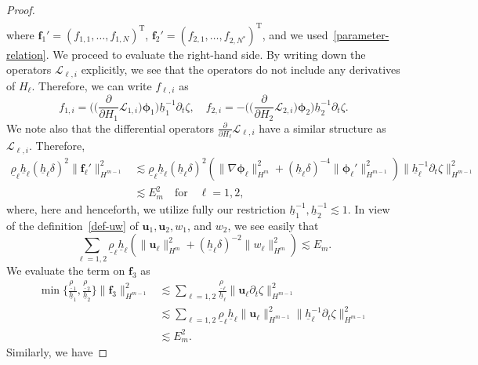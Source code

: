 \documentclass[11pt,leqno]{article}
\numberwithin{equation}{section}
\numberwithin{figure}{section}
\begin{document}
\begin{proof}
\begin{align}
\end{align}
%
where $\bm{f}_1'=(f_{1,1},\ldots,f_{1,N})^\mathrm{T}$, $\bm{f}_2'=(f_{2,1},\ldots,f_{2,N^*})^\mathrm{T}$, 
and we used~\eqref{parameter-relation}. 
We proceed to evaluate the right-hand side. 
By writing down the operators $\mathcal{L}_{\ell,i}$ explicitly, we see that the operators do not include 
any derivatives of $H_{\ell}$. 
Therefore, we can write $f_{\ell,i}$ as 
%
\[
f_{1,i} = \biggl(\biggl(\frac{\partial}{\partial H_1}\mathcal{L}_{1,i}\biggr)\bm{\phi}_1\biggr)
  \underline{h}_1^{-1}\partial_t\zeta, \quad
f_{2,i} = -\biggl(\biggl(\frac{\partial}{\partial H_2}\mathcal{L}_{2,i}\biggr)\bm{\phi}_2\biggr)
  \underline{h}_2^{-1}\partial_t\zeta.
\]
%
We note also that the differential operators $\frac{\partial}{\partial H_\ell}\mathcal{L}_{\ell,i}$ have a 
similar structure as $\mathcal{L}_{\ell,i}$. 
Therefore, 
%
\begin{align*}
\underline{\rho}_\ell\underline{h}_\ell
  (\underline{h}_\ell\delta)^2\|\bm{f}_\ell'\|_{H^{m-1}}^2
&\lesssim \underline{\rho}_\ell\underline{h}_\ell
  (\underline{h}_\ell\delta)^2 ( \|\nabla\bm{\phi}_\ell\|_{H^m}^2
   + (\underline{h}_\ell\delta)^{-4}\|\bm{\phi}_\ell'\|_{H^{m-1}}^2 ) \|\underline{h}_\ell^{-1}\partial_t\zeta\|_{H^{m-1}}^2 \\
&\lesssim E_m^2 \quad\mbox{for}\quad \ell=1,2,
\end{align*}
%
where, here and henceforth, we utilize fully our restriction $\underline{h}_1^{-1},\underline{h}_2^{-1} \lesssim 1$. 
In view of the definition~\eqref{def-uw} of $\bm{u}_1, \bm{u}_2,w_1$, and $w_2$, we see easily that 
%
\begin{equation}\label{estimates-uw}
\sum_{\ell=1,2}\underline{\rho}_\ell\underline{h}_\ell(\|\bm{u}_\ell\|_{H^m}^2
 + (\underline{h}_\ell\delta)^{-2}\|w_\ell\|_{H^m}^2 ) \lesssim E_m.
\end{equation}
%
We evaluate the term on $\bm{f}_3$ as 
%
\begin{align*}
\min\biggl\{\frac{\underline{\rho}_1}{\underline{h}_1},\frac{\underline{\rho}_2}{\underline{h}_2} \biggr\}
  \|\bm{f}_3\|_{H^{m-1}}^2
&\lesssim \sum_{\ell=1,2} \frac{\underline{\rho}_\ell}{\underline{h}_\ell}\|\bm{u}_\ell\partial_t\zeta\|_{H^{m-1}}^2 \\
&\lesssim \sum_{\ell=1,2} \underline{\rho}_\ell\underline{h}_\ell
  \|\bm{u}_\ell\|_{H^{m-1}}^2\|\underline{h}_\ell^{-1}\partial_t\zeta\|_{H^{m-1}}^2 \\
&\lesssim E_m^2.
\end{align*}
%
Similarly, we have 

\end{proof}
\end{document}
